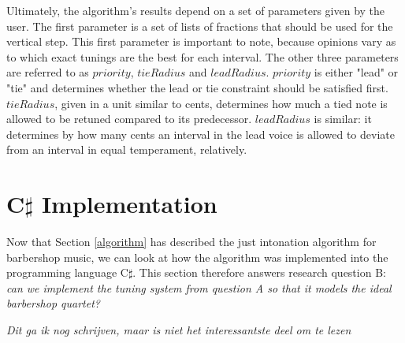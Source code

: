 \documentclass[a4paper]{article}
\begin{document}
Ultimately, the algorithm's results depend on a set of parameters given by the user. The first parameter is a set of lists of fractions that should be used for the vertical step. This first parameter is important to note, because opinions vary as to which exact tunings are the best for each interval. The other three parameters are referred to as $\mathit{priority}$, $\mathit{tieRadius}$ and $\mathit{leadRadius}$. $\mathit{priority}$ is either "lead" or "tie" and determines whether the lead or tie constraint should be satisfied first. $\mathit{tieRadius}$, given in a unit similar to cents, determines how much a tied note is allowed to be retuned compared to its predecessor. $\mathit{leadRadius}$ is similar: it determines by how many cents an interval in the lead voice is allowed to deviate from an interval in equal temperament, relatively.

\section{C$\sharp$ Implementation}
\label{implementation}
Now that Section \ref{algorithm} has described the just intonation algorithm for barbershop music, we can look at how the algorithm was implemented into the programming language C$\sharp$. This section therefore answers research question B: {\it can we implement the tuning system from question A so that it models the ideal barbershop quartet?}

\textit{\color{red}Dit ga ik nog schrijven, maar is niet het interessantste deel om te lezen}

\end{document}
